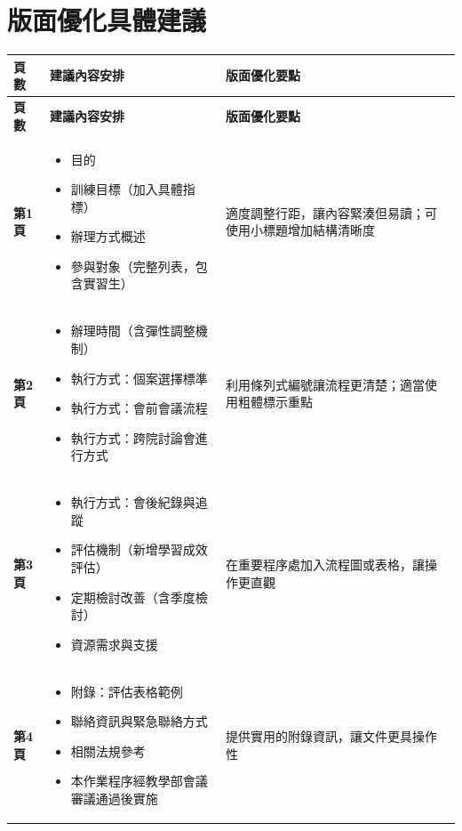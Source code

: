 \documentclass{article}
\begin{document}
\vspace{1cm}

\section*{版面優化具體建議}

\begin{longtable}{|>{\centering\arraybackslash}p{2.5cm}|>{\raggedright\arraybackslash}p{6cm}|>{\raggedright\arraybackslash}p{5.5cm}|}
\hline
\rowcolor{lightgray}
\textbf{頁數} & \textbf{建議內容安排} & \textbf{版面優化要點} \\
\hline
\endfirsthead

\hline
\rowcolor{lightgray}
\textbf{頁數} & \textbf{建議內容安排} & \textbf{版面優化要點} \\
\hline
\endhead

\hline
\endfoot

\hline
\endlastfoot

\textbf{第1頁} & 
\begin{itemize}
    \item 目的
    \item 訓練目標（加入具體指標）
    \item 辦理方式概述
    \item 參與對象（完整列表，包含實習生）
\end{itemize} & 
適度調整行距，讓內容緊湊但易讀；可使用小標題增加結構清晰度 \\
\hline

\textbf{第2頁} & 
\begin{itemize}
    \item 辦理時間（含彈性調整機制）
    \item 執行方式：個案選擇標準
    \item 執行方式：會前會議流程
    \item 執行方式：跨院討論會進行方式
\end{itemize} & 
利用條列式編號讓流程更清楚；適當使用粗體標示重點 \\
\hline

\textbf{第3頁} & 
\begin{itemize}
    \item 執行方式：會後紀錄與追蹤
    \item 評估機制（新增學習成效評估）
    \item 定期檢討改善（含季度檢討）
    \item 資源需求與支援
\end{itemize} & 
在重要程序處加入流程圖或表格，讓操作更直觀 \\
\hline

\textbf{第4頁} & 
\begin{itemize}
    \item 附錄：評估表格範例
    \item 聯絡資訊與緊急聯絡方式
    \item 相關法規參考
    \item 本作業程序經教學部會議審議通過後實施
\end{itemize} & 
提供實用的附錄資訊，讓文件更具操作性 \\
\hline

\end{longtable}
\end{document}
